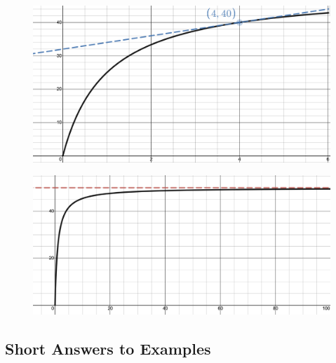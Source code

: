     \begin{figure}[h!]
 \centering
    \includegraphics[scale=0.275]{images/productQuotient/11_6b.png}
    \caption{}
    \end{figure}
      \begin{figure}[h!]
 \centering
    \includegraphics[scale=0.275]{images/productQuotient/11_6c.png}
    \caption{}
    \end{figure}
\newpage






\newpage
\subsection*{Short Answers to Examples}



